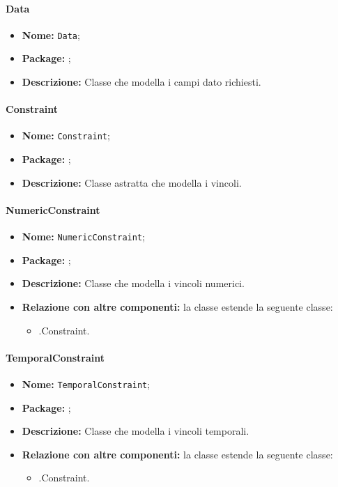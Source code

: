 \paragraph{Data}
\begin{itemize}
\item \textbf{Nome:} \texttt{Data};
\item \textbf{Package:} \texttt{\smodel{}};
\item \textbf{Descrizione:} Classe che modella i campi dato richiesti.
\end{itemize}

\paragraph{Constraint}
\begin{itemize}
\item \textbf{Nome:} \texttt{Constraint};
\item \textbf{Package:} \texttt{\smodel{}};
\item \textbf{Descrizione:} Classe astratta che modella i vincoli.
\end{itemize}

\paragraph{NumericConstraint}
\begin{itemize}
\item \textbf{Nome:} \texttt{NumericConstraint};
\item \textbf{Package:} \texttt{\smodel{}};
\item \textbf{Descrizione:} Classe che modella i vincoli numerici.
\item \textbf{Relazione con altre componenti:} la classe estende la seguente classe:
		\begin{itemize}
			\item \smodel{}.Constraint.
		\end{itemize}
\end{itemize}

\paragraph{TemporalConstraint}
\begin{itemize}
\item \textbf{Nome:} \texttt{TemporalConstraint};
\item \textbf{Package:} \texttt{\smodel{}};
\item \textbf{Descrizione:} Classe che modella i vincoli temporali.
\item \textbf{Relazione con altre componenti:} la classe estende la seguente classe:
		\begin{itemize}
			\item \smodel{}.Constraint.
		\end{itemize}
\end{itemize}

